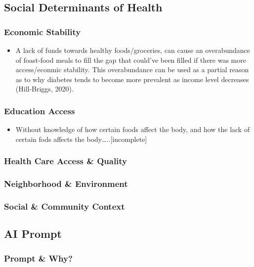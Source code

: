 \documentclass[11pt]{article}
\begin{document}
\subsection{Social Determinants of Health}
\label{sec:orgf8f7eb9}
\subsubsection{Economic Stability}
\label{sec:org6a7885b}
\begin{itemize}
\item A lack of funds towards healthy foods/groceries, can cause an overabundance of foast-food meals to fill the gap that could've been filled if there was more access/econmic stability. This overabundance can be used as a partial reason as to why diabetes tends to become more prevalent as income level decreases (Hill-Briggs, 2020).
\end{itemize}
\subsubsection{Education Access}
\label{sec:orgc20ba80}
\begin{itemize}
\item Without knowledge of how certain foods affect the body, and how the lack of certain fods affects the body\ldots{}..[incomplete]
\end{itemize}
\subsubsection{Health Care Access \& Quality}
\label{sec:org31082d0}
\subsubsection{Neighborhood  \& Environment}
\label{sec:orgad59b75}
\subsubsection{Social \& Community Context}
\label{sec:orgd59ba67}
\subsection{AI Prompt}
\label{sec:orgbe4e77c}
\subsubsection{Prompt \& Why?}
\label{sec:orga74b38a}
\end{document}
